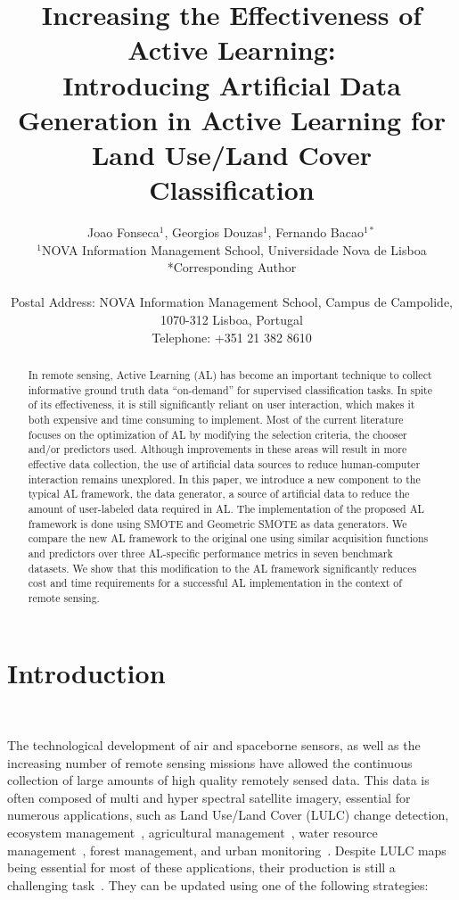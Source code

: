 \documentclass[parskip=full]{scrartcl}
\title{Increasing the Effectiveness of Active Learning:\\ 
	\LARGE{Introducing Artificial Data Generation in Active Learning for Land Use/Land Cover Classification}}
\author{
	Joao Fonseca\(^{1}\), Georgios Douzas\(^{1}\), Fernando Bacao\(^{1*}\) 
	\\
	\small{\(^{1}\)NOVA Information Management School, Universidade Nova de Lisboa}
	\\
	\small{*Corresponding Author}
	\\
	\\
	\small{Postal Address: NOVA Information Management School, Campus de Campolide, 1070-312 Lisboa, Portugal}
	\\
	\small{Telephone: +351 21 382 8610}
}
\date{}
\begin{document}
\maketitle

\begin{abstract}
    In remote sensing, Active Learning (AL) has become an important technique
    to collect informative ground truth data ``on-demand'' for supervised
    classification tasks.  In spite of its effectiveness, it is still
    significantly reliant on user interaction, which makes it both expensive
    and time consuming to implement.  Most of the current literature focuses on
    the optimization of AL by modifying the selection criteria, the chooser
    and/or predictors used.  Although improvements in these areas will result
    in more effective data collection, the use of artificial data sources to
    reduce human-computer interaction remains unexplored. In this paper, we
    introduce a new component to the typical AL framework, the data generator,
    a source of artificial data to reduce the amount of user-labeled data
    required in AL\@.  The implementation of the proposed AL framework is done
    using SMOTE and Geometric SMOTE as data generators.  We compare the new AL
    framework to the original one using similar acquisition functions and
    predictors over three AL-specific performance metrics in seven benchmark
    datasets. We show that this modification to the AL framework significantly
    reduces cost and time requirements for a successful AL implementation in
    the context of remote sensing. 
\end{abstract}

\section{Introduction}~\label{sec:introduction}

The technological development of air and spaceborne sensors, as well as the
increasing number of remote sensing missions have allowed the continuous
collection of large amounts of high quality remotely sensed data. This data is
often composed of multi and hyper spectral satellite imagery, essential for
numerous applications, such as Land Use/Land Cover (LULC) change detection,
ecosystem management~\cite{Nagai2020}, agricultural
management~\cite{Huang2018}, water resource management~\cite{Wang2018}, forest
management, and urban monitoring~\cite{Khatami2016}. Despite LULC maps being
essential for most of these applications, their production is still a
challenging task~\cite{Gavade2019, Wulder2018}. They can be updated using
one of the following strategies:
\end{document}
